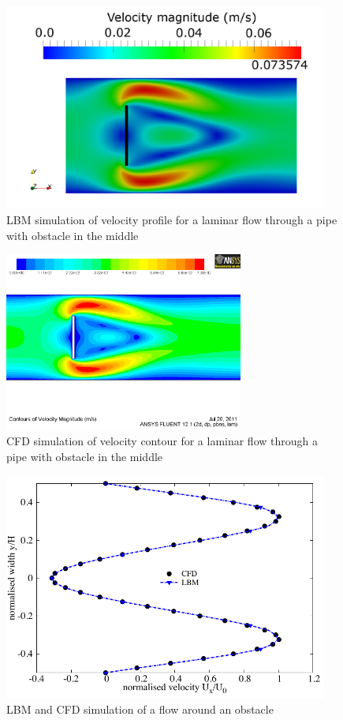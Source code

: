\begin{figure}[htbp]
\centering
\hspace{-13mm}\includegraphics[width=0.95\textwidth]{LBM_Obstacle}
\caption{LBM simulation of velocity profile for a laminar flow through a pipe 
with obstacle in the middle}
\label{fig:Obstacle}
\end{figure}

\begin{figure}[htbp]
\centering
\includegraphics[width=0.7\textwidth]{CFD_Obstacle}
\caption{CFD simulation of velocity contour for a laminar flow through a pipe 
with obstacle in the middle}
\label{fig:obsvc}
\end{figure}

\begin{figure}[h]
\centering
\includegraphics[width=0.95\textwidth]{Obstacle}
\caption{LBM and CFD simulation of a flow around an obstacle}
\label{fig:LBM}
\end{figure}

